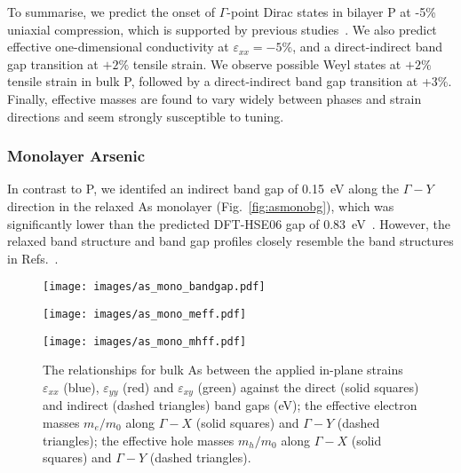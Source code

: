 To summarise, 
we predict the onset of $\Gamma$-point 
Dirac {states} in bilayer P 
at -5\% uniaxial compression, 
which is supported by previous 
studies~\cite{2053-1583-4-2-025071,doi:10.1021/acs.nanolett.5b04106}.
%
We also predict effective one-dimensional conductivity 
at $\varepsilon_{xx}=-5\%$, 
and a direct-indirect band gap transition at 
$+2\%$ tensile strain. 
%
We observe possible Weyl {states} 
at $+2\%$ tensile strain in bulk P, 
followed by a direct-indirect 
band gap transition at +3\%.
%
Finally, effective masses  
are found to vary widely 
between phases and strain directions 
and seem strongly susceptible to tuning. 


\subsubsection{Monolayer Arsenic}
In contrast to P, 
we identifed an indirect 
band gap of 0.15~eV along the 
$\Gamma-Y$ direction
in the relaxed As monolayer (Fig.~\ref{fig:asmonobg}),
which was significantly lower than the  
predicted DFT-HSE06 gap of 0.83~eV~\cite{1882-0786-8-5-055201}.
%
However, 
the relaxed band structure and band gap profiles 
closely resemble the band structures in 
Refs.~\cite{PhysRevB.91.085423,doi:10.1063/1.4943548}.
 
\begin{figure}[th!]
\begin{subfloat}{
\texttt{[image: images/as\_mono\_bandgap.pdf]}
  \label{fig:asmonobg}}
\end{subfloat}
%
\begin{subfloat}[Monolayer As $m_e/m_0$]{
\texttt{[image: images/as\_mono\_meff.pdf]}
  \label{fig:asmonomeff}}
\end{subfloat}
%
\begin{subfloat}[Monolayer As $m_h/m_0$]{
\texttt{[image: images/as\_mono\_mhff.pdf]}
  \label{fig:asmonomhff}}
\end{subfloat}
\caption[Electronic properties of monolayer arsenic for in-plane strains]
{The relationships for bulk As between 
the applied in-plane strains $\varepsilon_{xx}$ (blue),
$\varepsilon_{yy}$ (red) and $\varepsilon_{xy}$ (green) against 
%
\protect{}
the direct (solid  squares) and indirect 
(dashed triangles) band gaps (eV);
%
\protect{}
the effective electron masses $m_e/m_0$ 
along $\Gamma-X$ (solid squares) and 
$\Gamma-Y$ (dashed triangles);
%
\protect{}
the effective hole masses $m_h/m_0$ 
along $\Gamma-X$ (solid squares) and 
$\Gamma-Y$ (dashed triangles).}
\label{fig:as_mono_elec_properties}
\end{figure}


